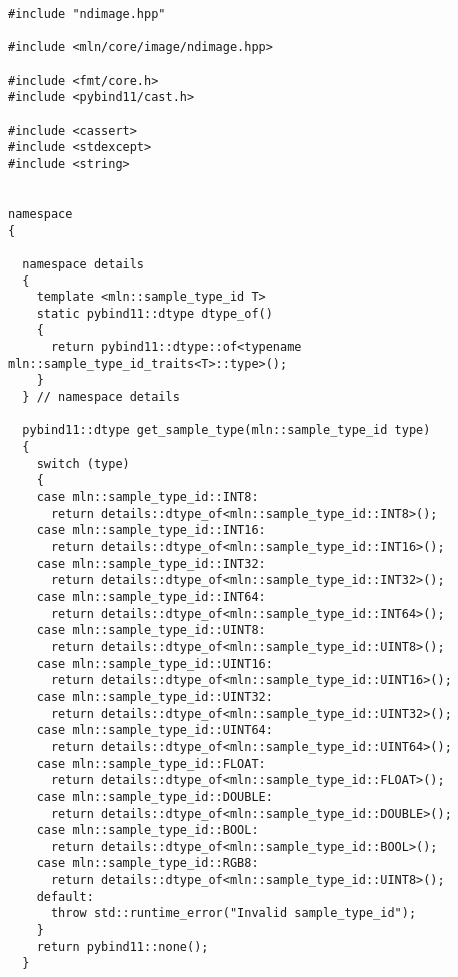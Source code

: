 \begin{verbatim}
#include "ndimage.hpp"

#include <mln/core/image/ndimage.hpp>

#include <fmt/core.h>
#include <pybind11/cast.h>

#include <cassert>
#include <stdexcept>
#include <string>


namespace
{

  namespace details
  {
    template <mln::sample_type_id T>
    static pybind11::dtype dtype_of()
    {
      return pybind11::dtype::of<typename mln::sample_type_id_traits<T>::type>();
    }
  } // namespace details

  pybind11::dtype get_sample_type(mln::sample_type_id type)
  {
    switch (type)
    {
    case mln::sample_type_id::INT8:
      return details::dtype_of<mln::sample_type_id::INT8>();
    case mln::sample_type_id::INT16:
      return details::dtype_of<mln::sample_type_id::INT16>();
    case mln::sample_type_id::INT32:
      return details::dtype_of<mln::sample_type_id::INT32>();
    case mln::sample_type_id::INT64:
      return details::dtype_of<mln::sample_type_id::INT64>();
    case mln::sample_type_id::UINT8:
      return details::dtype_of<mln::sample_type_id::UINT8>();
    case mln::sample_type_id::UINT16:
      return details::dtype_of<mln::sample_type_id::UINT16>();
    case mln::sample_type_id::UINT32:
      return details::dtype_of<mln::sample_type_id::UINT32>();
    case mln::sample_type_id::UINT64:
      return details::dtype_of<mln::sample_type_id::UINT64>();
    case mln::sample_type_id::FLOAT:
      return details::dtype_of<mln::sample_type_id::FLOAT>();
    case mln::sample_type_id::DOUBLE:
      return details::dtype_of<mln::sample_type_id::DOUBLE>();
    case mln::sample_type_id::BOOL:
      return details::dtype_of<mln::sample_type_id::BOOL>();
    case mln::sample_type_id::RGB8:
      return details::dtype_of<mln::sample_type_id::UINT8>();
    default:
      throw std::runtime_error("Invalid sample_type_id");
    }
    return pybind11::none();
  }


\end{verbatim}
